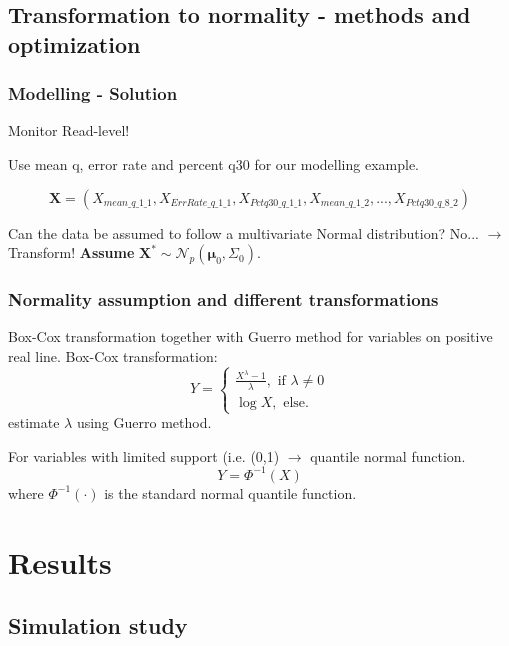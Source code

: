 \documentclass[10pt]{beamer}\usepackage[]{graphicx}\usepackage[]{color}
\begin{document}
\subsection{Transformation to normality - methods and optimization}
\begin{frame}\frametitle{Modelling - Solution}

Monitor Read-level! 

Use mean q, error rate and percent q30 for our modelling example.

$$
\mathbf{X} = (X_{mean\_ q\_ 1\_ 1},X_{ErrRate\_ q\_ 1\_ 1},X_{Pctq30\_ q\_ 1\_ 1},X_{mean\_ q\_ 1\_ 2},..., X_{Pctq30\_ q\_ 8\_ 2})
$$

Can the data be assumed to follow a multivariate Normal distribution? No... $\rightarrow$ Transform! \textbf{Assume} $\mathbf{X}^*\sim \mathcal{N}_p(\boldsymbol{\mu}_0,\Sigma_0)$.
\end{frame}
 
  
\begin{frame}\frametitle{Normality assumption and different transformations}
 Box-Cox transformation together with Guerro method for variables on positive real line. Box-Cox transformation:
 $$
 Y = \begin{cases}
 \frac{X^{\lambda}-1}{\lambda}, \text{ if } \lambda\neq 0 \\
 \log X, \text{ else.}
 \end{cases}
 $$
 estimate $\lambda$ using Guerro method. 
 
For variables with limited support (i.e. (0,1) $\rightarrow$ quantile normal function.
$$ Y = \Phi^{-1}(X)
$$ where $\Phi^{-1}(\cdot)$ is the standard normal quantile function.
\end{frame}

\section{Results}
\subsection{Simulation study}
 
\end{document}
